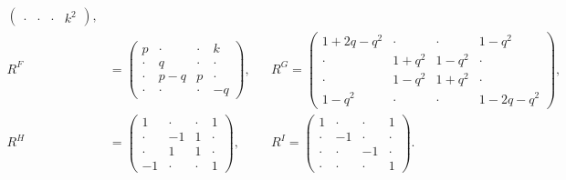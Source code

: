 \documentclass{article}
\begin{document}
\begin{align}
\begin{pmatrix}
        \cdot&\cdot&\cdot&k^2
    \end{pmatrix},
\\
   R^F&= \begin{pmatrix}
        p&\cdot&\cdot&k\\
        \cdot&q&\cdot&\cdot\\
        \cdot&p-q&p&\cdot\\
        \cdot&\cdot&\cdot&-q
    \end{pmatrix},
&&
  R^G=\begin{pmatrix}
        1+2q-q^2&\cdot&\cdot&1-q^2\\
        \cdot&1+q^2&1-q^2&\cdot\\
        \cdot&1-q^2&1+q^2&\cdot\\
        1-q^2&\cdot &\cdot&1-2q-q^2
    \end{pmatrix},
\\
   R^H&= \begin{pmatrix}
        1&\cdot&\cdot&1\\
        \cdot&-1&1&\cdot\\
        \cdot&1&1&\cdot\\
        -1&\cdot&\cdot&1
    \end{pmatrix},
&&
   R^I= \begin{pmatrix}
        1&\cdot&\cdot&1\\
        \cdot&-1&\cdot&\cdot\\
        \cdot&\cdot&-1&\cdot\\
        \cdot&\cdot&\cdot&1
    \end{pmatrix}.
\end{align}
\end{document}
